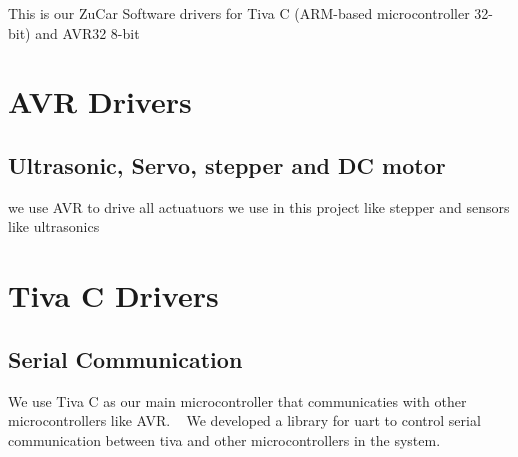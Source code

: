 This is our Zu\+Car Software drivers for Tiva C (A\+R\+M-\/based microcontroller 32-\/bit) and A\+V\+R32 8-\/bit\hypertarget{index_AVR_Drivers}{}\section{A\+V\+R Drivers}\label{index_AVR_Drivers}
\hypertarget{index_for_AVR}{}\subsection{Ultrasonic, Servo, stepper and D\+C motor}\label{index_for_AVR}
we use A\+VR to drive all actuatuors we use in this project like stepper and sensors like ultrasonics \hypertarget{index_Tiva_C_Drivers}{}\section{Tiva C Drivers}\label{index_Tiva_C_Drivers}
\hypertarget{index_Tiva}{}\subsection{Serial Communication}\label{index_Tiva}
We use Tiva C as our main microcontroller that communicaties with other microcontrollers like A\+VR. ~\newline
 We developed a library for uart to control serial communication between tiva and other microcontrollers in the system. 